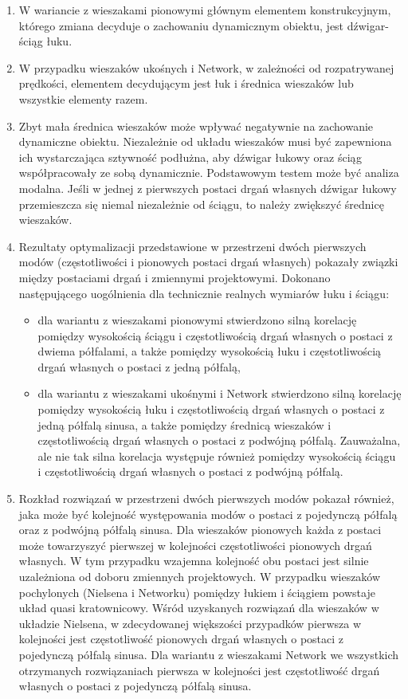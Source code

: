 \begin{enumerate}
\item W wariancie z wieszakami pionowymi głównym elementem konstrukcyjnym, którego zmiana decyduje o zachowaniu dynamicznym obiektu, jest dźwigar-ściąg łuku. 

\item W przypadku wieszaków ukośnych i Network, w zależności od rozpatrywanej prędkości, elementem decydującym jest łuk i średnica wieszaków lub wszystkie elementy razem. 

\item Zbyt mała średnica wieszaków może wpływać negatywnie na zachowanie dynamiczne obiektu. Niezależnie od układu wieszaków musi być zapewniona ich wystarczająca sztywność podłużna, aby dźwigar łukowy oraz ściąg współpracowały ze sobą dynamicznie. Podstawowym testem może być analiza modalna. Jeśli w jednej z pierwszych postaci drgań własnych dźwigar łukowy przemieszcza się niemal niezależnie od ściągu, to należy zwiększyć średnicę wieszaków. 

\item Rezultaty optymalizacji przedstawione w przestrzeni dwóch pierwszych modów (częstotliwości i pionowych postaci drgań własnych) pokazały związki między postaciami drgań i zmiennymi projektowymi. Dokonano następującego uogólnienia dla technicznie realnych wymiarów łuku i ściągu:
\begin{itemize} 
	\item dla wariantu z wieszakami pionowymi stwierdzono silną korelację pomiędzy wysokością ściągu i częstotliwością drgań własnych o postaci z dwiema półfalami, a także pomiędzy wysokością łuku i częstotliwością drgań własnych o postaci z jedną półfalą,
	\item dla wariantu z wieszakami ukośnymi i Network stwierdzono silną korelację pomiędzy wysokością łuku i częstotliwością drgań własnych o postaci z jedną półfalą sinusa, a także pomiędzy średnicą wieszaków i częstotliwością drgań własnych o postaci z podwójną półfalą. Zauważalna, ale nie tak silna korelacja występuje również pomiędzy wysokością ściągu i częstotliwością drgań własnych o postaci z podwójną półfalą. 
\end{itemize}

\item Rozkład rozwiązań w przestrzeni dwóch pierwszych modów pokazał również, jaka może być kolejność występowania modów o postaci z pojedynczą półfalą oraz z podwójną półfalą sinusa. Dla wieszaków pionowych każda z postaci może towarzyszyć pierwszej w kolejności częstotliwości pionowych drgań własnych. W tym przypadku wzajemna kolejność obu postaci jest silnie uzależniona od doboru zmiennych projektowych. W przypadku wieszaków pochylonych (Nielsena i Networku) pomiędzy łukiem i ściągiem powstaje układ quasi kratownicowy. Wśród uzyskanych rozwiązań dla wieszaków w układzie Nielsena, w zdecydowanej większości przypadków pierwsza w kolejności jest częstotliwość pionowych drgań własnych o postaci z pojedynczą półfalą sinusa. Dla wariantu z wieszakami Network we wszystkich otrzymanych rozwiązaniach pierwsza w kolejności jest częstotliwość drgań własnych o postaci z pojedynczą półfalą sinusa.


\end{enumerate}
